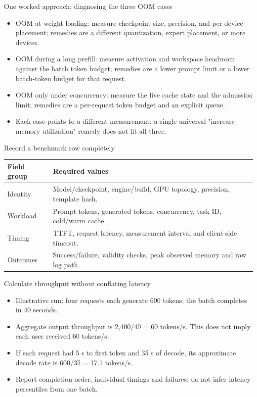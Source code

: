 \documentclass[aspectratio=169,11pt]{beamer}
\begin{document}
\begin{frame}[t,fragile]{One worked approach: diagnosing the three OOM cases}
\fontsize{11.5}{14}\selectfont
\begin{itemize}\setlength{\itemsep}{2mm}
\item OOM at weight loading: measure checkpoint size, precision, and per-device placement; remedies are a different quantization, expert placement, or more devices.
\item OOM during a long prefill: measure activation and workspace headroom against the batch token budget; remedies are a lower prompt limit or a lower batch-token budget for that request.
\item OOM only under concurrency: measure the live cache state and the admission limit; remedies are a per-request token budget and an explicit queue.
\item Each case points to a different measurement; a single universal "increase memory utilization" remedy does not fit all three.
\end{itemize}
\end{frame}
\begin{frame}[t,fragile]{Record a benchmark row completely}
\fontsize{10.5}{12.5}\selectfont\setlength{\tabcolsep}{4pt}\renewcommand{\arraystretch}{1.15}
\begin{tabular}{>{\raggedright\arraybackslash}p{}>{\raggedright\arraybackslash}p{}}
\toprule
\textbf{Field group} & \textbf{Required values} \\ \midrule
Identity & Model/checkpoint, engine/build, GPU topology, precision, template hash. \\[2pt]
Workload & Prompt tokens, generated tokens, concurrency, task ID, cold/warm cache. \\[2pt]
Timing & TTFT, request latency, measurement interval and client-side timeout. \\[2pt]
Outcomes & Success/failure, validity checks, peak observed memory and raw log path. \\[2pt]
\bottomrule\end{tabular}\par\vspace{2mm}
\end{frame}
\begin{frame}[t,fragile]{Calculate throughput without conflating latency}
\fontsize{11.5}{14}\selectfont
\begin{itemize}\setlength{\itemsep}{2mm}
\item Illustrative run: four requests each generate 600 tokens; the batch completes in 40 seconds.
\item Aggregate output throughput is 2,400/40 = 60 tokens/s. This does not imply each user received 60 tokens/s.
\item If each request had 5 s to first token and 35 s of decode, its approximate decode rate is 600/35 = 17.1 tokens/s.
\item Report completion order, individual timings and failures; do not infer latency percentiles from one batch.
\end{itemize}
\end{frame}
\end{document}
